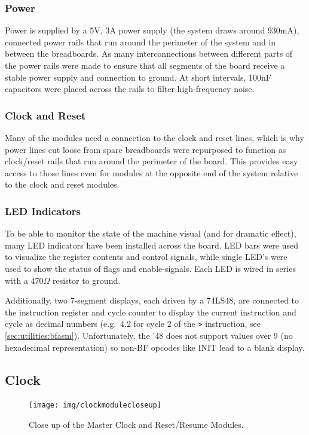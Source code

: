\subsubsection{Power}
Power is supplied by a 5V, 3A power supply (the system draws around 930mA), connected power rails that run around the perimeter of the system and in between the breadboards. As many interconnections between different parts of the power rails were made to ensure that all segments of the board receive a stable power supply and connection to ground. At short intervals, 100nF capacitors were placed across the rails to filter high-frequency noise.

\subsubsection{Clock and Reset}
Many of the modules need a connection to the clock and reset lines, which is why power lines cut loose from spare breadboards were repurposed to function as clock/reset rails that run around the perimeter of the board. This provides easy access to those lines even for modules at the opposite end of the system relative to the clock and reset modules.

\subsubsection{LED Indicators}
To be able to monitor the state of the machine visual (and for dramatic effect), many LED indicators have been installed across the board. LED bars were used to visualize the register contents and control signals, while single LED's were used to show the status of flags and enable-signals. Each LED is wired in series with a 470$\Omega$ resistor to ground.

Additionally, two 7-segment displays, each driven by a 74LS48, are connected to the instruction register and cycle counter to display the current instruction and cycle as decimal numbers (e.g.~4.2 for cycle 2 of the \texttt{>} instruction, see \ref{sec:utilities:bfasm}). Unfortunately, the '48 does not support values over 9 (no hexadecimal representation) so non-BF opcodes like INIT lead to a blank display. 



\newpage\subsection{Clock} \label{sec:clock}
\begin{figure}[H]
  \centering
  \texttt{[image: img/clockmodulecloseup]}
  \caption{Close up of the Master Clock and Reset/Resume Modules.}
  \label{fig:masterclockcloseup}
\end{figure}

